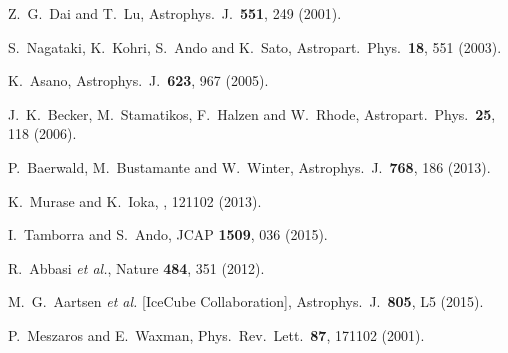 \documentclass[aps,prd,nofootinbib,twocolumn,floatfix,letterpaper,superscriptaddress,showpacs]{revtex4}
\begin{document}
\begin{thebibliography}{99}
  Z.~G.~Dai and T.~Lu,
  Astrophys.\ J.\  {\bf 551}, 249 (2001).

  S.~Nagataki, K.~Kohri, S.~Ando and K.~Sato,
  Astropart.\ Phys.\  {\bf 18}, 551 (2003).

  K.~Asano,
  Astrophys.\ J.\  {\bf 623}, 967 (2005).

  J.~K.~Becker, M.~Stamatikos, F.~Halzen and W.~Rhode,
  Astropart.\ Phys.\  {\bf 25}, 118 (2006).

  P.~Baerwald, M.~Bustamante and W.~Winter,
  Astrophys.\ J.\  {\bf 768}, 186 (2013).

  K.\ Murase and K.\ Ioka,
  , 121102 (2013).

  I.~Tamborra and S.~Ando,
  JCAP {\bf 1509}, 036 (2015).


  R.~Abbasi {\it et al.},
  Nature {\bf 484}, 351 (2012).

  M.~G.~Aartsen {\it et al.} [IceCube Collaboration],
  Astrophys.\ J.\  {\bf 805}, L5 (2015).




  P.~Meszaros and E.~Waxman,
  Phys.\ Rev.\ Lett.\  {\bf 87}, 171102 (2001).


\end{thebibliography}
\end{document}
